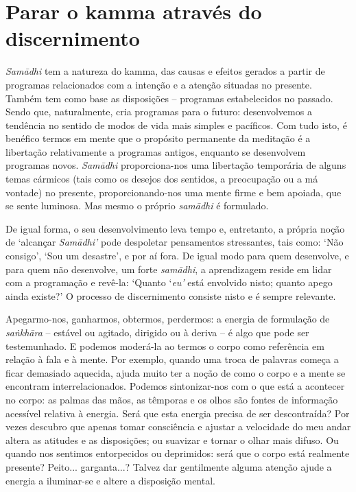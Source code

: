 \section{Parar o kamma através do discernimento}

\emph{Samādhi} tem a natureza do kamma, das causas e efeitos gerados a partir de programas relacionados com a intenção e a atenção situadas no presente. Também tem como base as disposições -- programas estabelecidos no passado. Sendo que, naturalmente, cria programas para o futuro: desenvolvemos a tendência no sentido de modos de vida mais simples e pacíficos. Com tudo isto, é benéfico termos em mente que o propósito permanente da meditação é a libertação relativamente a programas antigos, enquanto se desenvolvem programas novos. \emph{Samādhi} proporciona-nos uma libertação temporária de alguns temas cármicos (tais como os desejos dos sentidos, a preocupação ou a má vontade) no presente, proporcionando-nos uma mente firme e bem apoiada, que se sente luminosa. Mas mesmo o próprio \emph{samādhi} é formulado.

De igual forma, o seu desenvolvimento leva tempo e, entretanto, a própria noção de `alcançar \emph{Samādhi'} pode despoletar pensamentos stressantes, tais como: `Não consigo', `Sou um desastre', e por aí fora. De igual modo para quem desenvolve, e para quem não desenvolve, um forte \emph{samādhi}, a aprendizagem reside em lidar com a programação e revê-la: `Quanto `\emph{eu'} está envolvido nisto; quanto apego ainda existe?' O processo de discernimento consiste nisto e é sempre relevante.

Apegarmo-nos, ganharmos, obtermos, perdermos: a energia de formulação de \emph{saṅkhāra} -- estável ou agitado, dirigido ou à deriva -- é algo que pode ser testemunhado. E podemos moderá-la ao termos o corpo como referência em relação à fala e à mente. Por exemplo, quando uma troca de palavras começa a ficar demasiado aquecida, ajuda muito ter a noção de como o corpo e a mente se encontram interrelacionados. Podemos sintonizar-nos com o que está a acontecer no corpo: as palmas das mãos, as têmporas e os olhos são fontes de informação acessível relativa à energia. Será que esta energia precisa de ser descontraída? Por vezes descubro que apenas tomar consciência e ajustar a velocidade do meu andar altera as atitudes e as disposições; ou suavizar e tornar o olhar mais difuso. Ou quando nos sentimos entorpecidos ou deprimidos: será que o corpo está realmente presente? Peito... garganta...? Talvez dar gentilmente alguma atenção ajude a energia a iluminar-se e altere a disposição mental.

